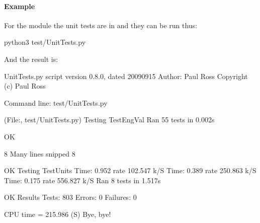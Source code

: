 \documentclass[letterpaper,10pt,english]{sphinxmanual}
\begin{document}
\paragraph{Example}
\label{\detokenize{testing/unit_tests:id1}}
For the module  the unit tests are in 
and they can be run thus:

\begin{sphinxVerbatim}[commandchars=\\\{\}]
\PYGZdl{} python3 test/UnitTests.py
\end{sphinxVerbatim}

And the result is:

\begin{sphinxVerbatim}[commandchars=\\\{\}]
UnitTests.py script version \PYGZdq{}0.8.0\PYGZdq{}, dated 2009\PYGZhy{}09\PYGZhy{}15
Author: Paul Ross
Copyright (c) Paul Ross

Command line:
test/UnitTests.py

(\PYGZsq{}File:\PYGZsq{}, \PYGZsq{}test/UnitTests.py\PYGZsq{})
Testing TestEngVal
\PYGZhy{}\PYGZhy{}\PYGZhy{}\PYGZhy{}\PYGZhy{}\PYGZhy{}\PYGZhy{}\PYGZhy{}\PYGZhy{}\PYGZhy{}\PYGZhy{}\PYGZhy{}\PYGZhy{}\PYGZhy{}\PYGZhy{}\PYGZhy{}\PYGZhy{}\PYGZhy{}\PYGZhy{}\PYGZhy{}\PYGZhy{}\PYGZhy{}\PYGZhy{}\PYGZhy{}\PYGZhy{}\PYGZhy{}\PYGZhy{}\PYGZhy{}\PYGZhy{}\PYGZhy{}\PYGZhy{}\PYGZhy{}\PYGZhy{}\PYGZhy{}\PYGZhy{}\PYGZhy{}\PYGZhy{}\PYGZhy{}\PYGZhy{}\PYGZhy{}\PYGZhy{}\PYGZhy{}\PYGZhy{}\PYGZhy{}\PYGZhy{}\PYGZhy{}\PYGZhy{}\PYGZhy{}\PYGZhy{}\PYGZhy{}\PYGZhy{}\PYGZhy{}\PYGZhy{}\PYGZhy{}\PYGZhy{}\PYGZhy{}\PYGZhy{}\PYGZhy{}\PYGZhy{}\PYGZhy{}\PYGZhy{}\PYGZhy{}\PYGZhy{}\PYGZhy{}\PYGZhy{}\PYGZhy{}\PYGZhy{}\PYGZhy{}\PYGZhy{}\PYGZhy{}
Ran 55 tests in 0.002s

OK

8\PYGZlt{}\PYGZhy{}\PYGZhy{}\PYGZhy{}\PYGZhy{}\PYGZhy{}\PYGZhy{}\PYGZhy{}\PYGZhy{} Many lines snipped \PYGZhy{}\PYGZhy{}\PYGZhy{}\PYGZhy{}\PYGZhy{}\PYGZhy{}\PYGZhy{}\PYGZhy{}\PYGZgt{}8

OK
Testing TestUnits
Time:    0.952 rate    102.547 k/S Time:    0.389 rate    250.863 k/S Time:    0.175 rate    556.827 k/S \PYGZhy{}\PYGZhy{}\PYGZhy{}\PYGZhy{}\PYGZhy{}\PYGZhy{}\PYGZhy{}\PYGZhy{}\PYGZhy{}\PYGZhy{}\PYGZhy{}\PYGZhy{}\PYGZhy{}\PYGZhy{}\PYGZhy{}\PYGZhy{}\PYGZhy{}\PYGZhy{}\PYGZhy{}\PYGZhy{}\PYGZhy{}\PYGZhy{}\PYGZhy{}\PYGZhy{}\PYGZhy{}\PYGZhy{}\PYGZhy{}\PYGZhy{}\PYGZhy{}\PYGZhy{}\PYGZhy{}\PYGZhy{}\PYGZhy{}\PYGZhy{}\PYGZhy{}\PYGZhy{}\PYGZhy{}\PYGZhy{}\PYGZhy{}\PYGZhy{}\PYGZhy{}\PYGZhy{}\PYGZhy{}\PYGZhy{}\PYGZhy{}\PYGZhy{}\PYGZhy{}\PYGZhy{}\PYGZhy{}\PYGZhy{}\PYGZhy{}\PYGZhy{}\PYGZhy{}\PYGZhy{}\PYGZhy{}\PYGZhy{}\PYGZhy{}\PYGZhy{}\PYGZhy{}\PYGZhy{}\PYGZhy{}\PYGZhy{}\PYGZhy{}\PYGZhy{}\PYGZhy{}\PYGZhy{}\PYGZhy{}\PYGZhy{}\PYGZhy{}\PYGZhy{}
Ran 8 tests in 1.517s

OK
Results
   Tests: 803
  Errors: 0
Failures: 0

CPU time =  215.986 (S)
Bye, bye!
\end{sphinxVerbatim}
\end{document}
